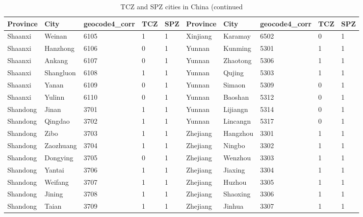 \documentclass[12pt]{article}
\begin{document}
\begin{table}[!htbp] \centering
  \caption{TCZ and SPZ cities in China (continued}
  \begin{adjustbox}{width=\textwidth, totalheight=\baselineskip,keepaspectratio}
    \label{tab:appendix3}
\begin{tabular}{llllllllll}
\hline
Province       & City         & geocode4\_corr & TCZ & SPZ & Province & City        & geocode4\_corr & TCZ & SPZ \\
\hline
Shaanxi  & Weinan    & 6105           & 1   & 1   & Xinjiang & Karamay  & 6502           & 0   & 1   \\
Shaanxi  & Hanzhong  & 6106           & 0   & 1   & Yunnan   & Kunming  & 5301           & 1   & 1   \\
Shaanxi  & Ankang    & 6107           & 0   & 1   & Yunnan   & Zhaotong & 5306           & 1   & 1   \\
Shaanxi  & Shangluon & 6108           & 1   & 1   & Yunnan   & Qujing   & 5303           & 1   & 1   \\
Shaanxi  & Yanan     & 6109           & 0   & 1   & Yunnan   & Simaon   & 5309           & 0   & 1   \\
Shaanxi  & Yulinn    & 6110           & 0   & 1   & Yunnan   & Baoshan  & 5312           & 0   & 1   \\
Shandong & Jinan     & 3701           & 1   & 1   & Yunnan   & Lijiangn & 5314           & 0   & 1   \\
Shandong & Qingdao   & 3702           & 1   & 1   & Yunnan   & Lincangn & 5317           & 0   & 1   \\
Shandong & Zibo      & 3703           & 1   & 1   & Zhejiang & Hangzhou & 3301           & 1   & 1   \\
Shandong & Zaozhuang & 3704           & 1   & 1   & Zhejiang & Ningbo   & 3302           & 1   & 1   \\
Shandong & Dongying  & 3705           & 0   & 1   & Zhejiang & Wenzhou  & 3303           & 1   & 1   \\
Shandong & Yantai    & 3706           & 1   & 1   & Zhejiang & Jiaxing  & 3304           & 1   & 1   \\
Shandong & Weifang   & 3707           & 1   & 1   & Zhejiang & Huzhou   & 3305           & 1   & 1   \\
Shandong & Jining    & 3708           & 1   & 1   & Zhejiang & Shaoxing & 3306           & 1   & 1   \\
Shandong & Taian     & 3709           & 1   & 1   & Zhejiang & Jinhua   & 3307           & 1   & 1   \\

\end{tabular}
\end{adjustbox}
\end{table}
\end{document}
